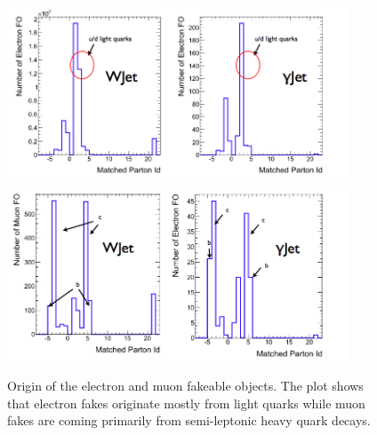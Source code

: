 \begin{figure}[!htbp]                                                                                         
\begin{center}                                                                                                
\includegraphics[width=0.9\textwidth]{figures/ElectronFakeOrigin.png}                                            
\includegraphics[width=0.9\textwidth]{figures/MuonFakeOrigin.png}\\                                           
\caption{ Origin of the electron and muon fakeable objects. The plot shows 
that electron fakes originate mostly from light quarks while muon fakes
are coming primarily from semi-leptonic heavy quark decays.}
\label{fig:fakeorigins}                                                                                          
\end{center}                                                                                                  
\end{figure}   


